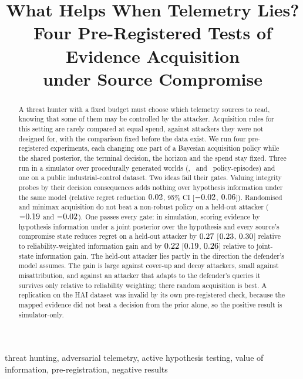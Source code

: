 \documentclass[conference]{IEEEtran}
\begin{document}
\title{What Helps When Telemetry Lies?\\Four Pre-Registered Tests of Evidence Acquisition\\under Source Compromise}

\author{
}

\maketitle

\begin{abstract}
A threat hunter with a fixed budget must choose which telemetry sources to read, knowing that some of them may be
controlled by the attacker. Acquisition rules for this setting are rarely compared at equal spend, against attackers
they were not designed for, with the comparison fixed before the data exist. We run four pre-registered experiments,
each changing one part of a Bayesian acquisition policy while the shared posterior, the terminal decision, the horizon
and the spend stay fixed. Three run in a simulator over procedurally generated worlds (\numnEL, \numnET\ and \numnEU\
policy-episodes) and one on a public industrial-control dataset. Two ideas fail their gates. Valuing integrity probes by
their decision consequences adds nothing over hypothesis information under the same model (relative regret reduction
$0.02$, 95\% CI [$-0.02$, $0.06$]). Randomised and minimax acquisition do not beat a non-robust policy on a
held-out attacker ($-0.19$ and $-0.02$). One passes every gate: in simulation, scoring evidence by hypothesis
information under a joint posterior over the hypothesis and every source's compromise state reduces regret on a
held-out attacker by $0.27$ [$0.23$, $0.30$] relative to reliability-weighted information gain and by $0.22$
[$0.19$, $0.26$] relative to joint-state information gain. The held-out attacker lies partly in the direction the
defender's model assumes. The gain is large against cover-up and decoy attackers, small against misattribution, and
against an attacker that adapts to the defender's queries it survives only relative to reliability weighting; there
random acquisition is best. A replication on the HAI dataset was invalid by its own pre-registered check, because the
mapped evidence did not beat a decision from the prior alone, so the positive result is simulator-only.
\end{abstract}

\begin{IEEEkeywords}
threat hunting, adversarial telemetry, active hypothesis testing, value of information, pre-registration, negative results
\end{IEEEkeywords}
\end{document}
